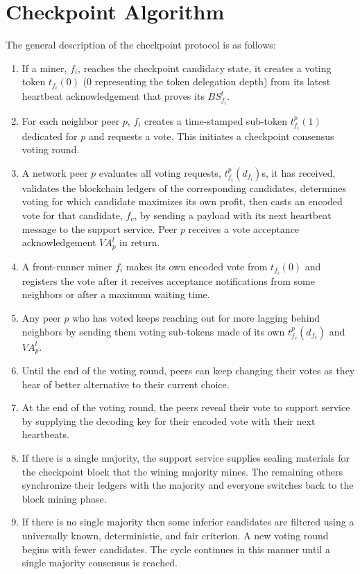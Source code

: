 \section{Checkpoint Algorithm}
\label{s-algorithm}
The general description of the checkpoint protocol is as follows:
\begin{enumerate}
\item If a miner, $f_i$, reaches the checkpoint candidacy state, it creates a voting token $t_{f_i}(0)$ (0 representing the token delegation depth) from its latest heartbeat acknowledgement that proves its  $BS_{f_i}^t$.
\item For each neighbor peer $p$, $f_i$ creates a time-stamped sub-token $t_{f_i}^{p}(1)$ dedicated for $p$ and requests a vote. This initiates a checkpoint consensus voting round.
\item A network peer $p$ evaluates all voting requests, $t_{f_i}^{p}(d_{f_i})$s, it has received, validates the blockchain ledgers of the corresponding candidates, determines voting for which candidate maximizes its own profit, then casts an encoded vote for that candidate, $f_c$, by sending a payload with its next heartbeat message to the support service. Peer $p$ receives a vote acceptance acknowledgement $VA_p^t$ in return.
\item A front-runner miner $f_i$ makes its own encoded vote from $t_{f_i}(0)$ and registers the vote after it receives acceptance notifications from some neighbors or after a maximum waiting time.
\item Any peer $p$ who has voted keeps reaching out for more lagging behind neighbors by sending them voting sub-tokens made of its own $t_{f_c}^{p}(d_{f_c})$ and $VA_p^t$.
\item Until the end of the voting round, peers can keep changing their votes as they hear of better alternative to their current choice.   
\item At the end of the voting round, the peers reveal their vote to support service by supplying the decoding key for their encoded vote with their next heartbeats.
\item If there is a single majority, the support service supplies sealing materials for the checkpoint block that the wining majority mines. The remaining others synchronize their ledgers with the majority and everyone switches back to the block mining phase.
\item If there is no single majority then some inferior candidates are filtered using a universally known, deterministic, and fair criterion. A new voting round begins with fewer candidates. The cycle continues in this manner until a single majority consensus is reached.                              
\end{enumerate}

